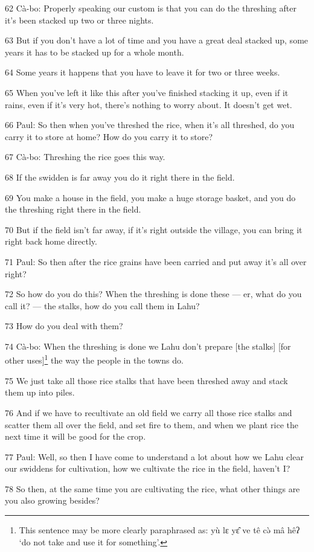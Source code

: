 62 Cà-bo: Properly speaking our custom is that you can do the threshing after
it's been stacked up two or three nights.

63 But if you don't have a lot of time and you have a great deal stacked up, some
years it has to be stacked up for a whole month.

64 Some years it happens that you have to leave it for two or three weeks.

65 When you've left it like this after you've finished stacking it up, even if
it rains, even if it's very hot, there's nothing to worry about. It doesn't get
wet.

66 Paul: So then when you've threshed the rice, when it's all threshed, do you
carry it to store at home? How do you carry it to store?

67 Cà-bo: Threshing the rice goes this way.

68 If the swidden is far away you do it right there in the field.

69 You make a house in the field, you make a huge storage basket, and you do the
threshing right there in the field.

70 But if the field isn't far away, if it's right outside the village, you can
bring it right back home directly.

71 Paul: So then after the rice grains have been carried and put away it's all
over right?

72 So how do you do this? When the threshing is done these --- er, what do you
call it? --- the stalks, how do you call them in Lahu?

73 How do you deal with them?

74 Cà-bo: When the threshing is done we Lahu don't prepare [the stalks] [for other
uses]\footnote{This sentence may be more clearly paraphrased as: yù lɛ yɛ̂ ve tê cə̀ mâ hêʔ `do not take and use it for something'.} the way the people in the towns do.

75 We just take all those rice stalks that have been threshed away and stack them
up into piles.

76 And if we have to recultivate an old field we carry all those rice stalks and
scatter them all over the field, and set fire to them, and when we plant rice the
next time it will be good for the crop.

77 Paul: Well, so then I have come to understand a lot about how we Lahu clear
our swiddens for cultivation, how we cultivate the rice in the field, haven't I?

78 So then, at the same time you are cultivating the rice, what other things are
you also growing besides?

